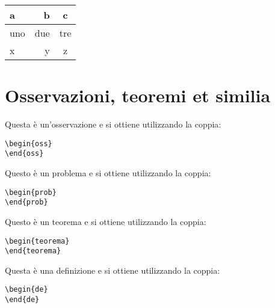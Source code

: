 \begin{center}
\begin{tabular}{lr|c}
\textbf{a} & \textbf{b} & \textbf{c}\\
\hline
uno & due & tre\\
x & y & z
\end{tabular}
\end{center}


\vspace*{1cm}



\section{Osservazioni, teoremi et similia}
\begin{oss}
Questa \`e un'osservazione e si ottiene utilizzando la coppia:
\begin{center}
\begin{verbatim}
\begin{oss}
\end{oss}
\end{verbatim}
\end{center}
\end{oss}

\begin{prob}
Questo \`e un problema e si ottiene utilizzando la coppia:
\begin{center}
\begin{verbatim}
\begin{prob}
\end{prob}
\end{verbatim}
\end{center}
\end{prob}

\begin{teorema}
Questo \`e un teorema e si ottiene utilizzando la coppia:
\begin{center}
\begin{verbatim}
\begin{teorema}
\end{teorema}
\end{verbatim}
\end{center}
\end{teorema}


\begin{de}
Questa \`e una definizione e si ottiene utilizzando la coppia:
\begin{center}
\begin{verbatim}
\begin{de}
\end{de}
\end{verbatim}
\end{center}
\end{de}

